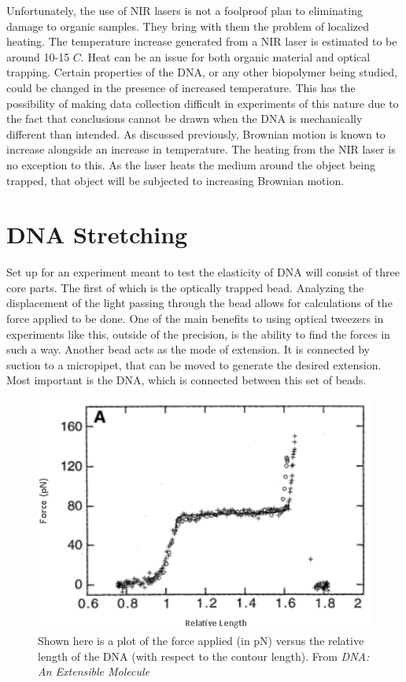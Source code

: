 \documentclass[%
 aip,
 amsmath,amssymb,
 reprint,%
]{revtex4-1}
\begin{document}
    Unfortunately, the use of NIR lasers is not a foolproof plan to eliminating damage to organic samples. They bring with them the problem of localized heating. The temperature increase generated from a NIR laser is estimated to be around 10-15 $C$\cite{NIR}. Heat can be an issue for both organic material and optical trapping. Certain properties of the DNA, or any other biopolymer being studied, could be changed in the presence of increased temperature\cite{NIR}. This has the possibility of making data collection difficult in experiments of this nature due to the fact that conclusions cannot be drawn when the DNA is mechanically different than intended. As discussed previously, Brownian motion is known to increase alongside an increase in temperature. The heating from the NIR laser is no exception to this. As the laser heats the medium around the object being trapped, that object will be subjected to increasing Brownian motion.



\section{DNA Stretching}
    Set up for an experiment meant to test the elasticity of DNA will consist of three core parts. The first of which is the optically trapped bead. Analyzing the displacement of the light passing through the bead allows for calculations of the force applied to be done. One of the main benefits to using optical tweezers in experiments like this, outside of the precision, is the ability to find the forces in such a way. Another bead acts as the mode of extension. It is connected by suction to a micropipet, that can be moved to generate the desired extension. Most important is the DNA, which is connected between this set of beads. 
    
    
\begin{figure}[h]
    \centering
    \includegraphics[scale=.64]{DNA extension plot.PNG}
    \caption{Shown here is a plot of the force applied (in pN) versus the relative length of the DNA (with respect to the contour length). From \textit{DNA: An Extensible Molecule}\cite{extensible}}
    \label{fig:DNA Ex}
\end{figure}
\end{document}
